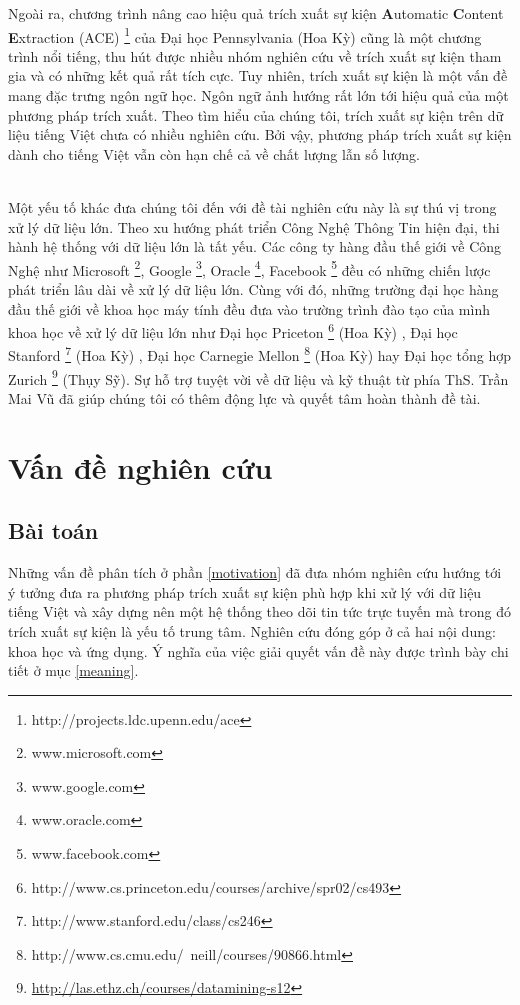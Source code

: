 Ngoài ra, chương trình nâng cao hiệu quả trích xuất sự kiện \textbf{A}utomatic \textbf{C}ontent \textbf{E}xtraction (ACE) \footnote{http://projects.ldc.upenn.edu/ace} của Đại học Pennsylvania (Hoa Kỳ) cũng là một chương trình nổi tiếng, thu hút được nhiều nhóm nghiên cứu về trích xuất sự kiện tham gia và có những kết quả rất tích cực. Tuy nhiên, trích xuất sự kiện là một vấn đề mang đặc trưng ngôn ngữ học. Ngôn ngữ ảnh hướng rất lớn tới hiệu quả của một phương pháp trích xuất. Theo tìm hiểu của chúng tôi, trích xuất sự kiện trên dữ liệu tiếng Việt chưa có nhiều nghiên cứu. Bởi vậy, phương pháp trích xuất sự kiện dành cho tiếng Việt vẫn còn hạn chế cả về chất lượng lẫn số lượng.

\\
\noindent Một yếu tố khác đưa chúng tôi đến với đề tài nghiên cứu này là sự thú vị trong xử lý dữ liệu lớn. Theo xu hướng phát triển Công Nghệ Thông Tin hiện đại, thi hành hệ thống với dữ liệu lớn là tất yếu. Các công ty hàng đầu thế giới về Công Nghệ như Microsoft \footnote{www.microsoft.com}, Google \footnote{www.google.com}, Oracle \footnote{www.oracle.com}, Facebook \footnote{www.facebook.com} đều có những chiến lược phát triển lâu dài về xử lý dữ liệu lớn. Cùng với đó, những trường đại học hàng đầu thế giới về khoa học máy tính đều đưa vào trường trình đào tạo của mình khoa học về xử lý dữ liệu lớn như Đại học Priceton \footnote{http://www.cs.princeton.edu/courses/archive/spr02/cs493} (Hoa Kỳ) , Đại học Stanford \footnote{http://www.stanford.edu/class/cs246} (Hoa Kỳ) , Đại học Carnegie Mellon \footnote{http://www.cs.cmu.edu/~neill/courses/90866.html} (Hoa Kỳ) hay Đại học tổng hợp Zurich \footnote{\href{http://las.ethz.ch/courses/datamining-s12}{http://las.ethz.ch/courses/datamining-s12}} (Thụy Sỹ). Sự hỗ trợ tuyệt vời về dữ liệu và kỹ thuật  từ phía ThS. Trần Mai Vũ đã giúp chúng tôi có thêm động lực và quyết tâm hoàn thành đề tài.



\section{Vấn đề nghiên cứu}
\label{problem}
    \subsection{Bài toán}
    \noindent Những vấn đề phân tích ở phần \ref{motivation} đã đưa nhóm nghiên cứu hướng tới ý tưởng đưa ra phương pháp trích xuất sự kiện phù hợp khi xử lý với dữ liệu tiếng Việt và xây dựng nên một hệ thống theo dõi tin tức trực tuyến mà trong đó trích xuất sự kiện là yếu tố trung tâm. Nghiên cứu đóng góp ở cả hai nội dung: khoa học và ứng dụng. Ý nghĩa của việc giải quyết vấn đề này được trình bày chi tiết ở mục \ref{meaning}.
